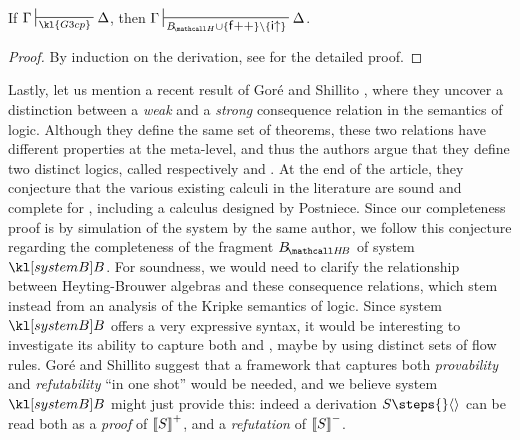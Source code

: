 \begin{lemma}[Simulation of \kl{G3cp}]
  If $\Gamma \prov{\kl{G3cp}} \Delta$, then $\Gamma \prov{\sysBH \cup
  \{\rsf{f{+}{+}}\} \setminus \{\rsf{i{\ua}}\}} \Delta$.
\end{lemma}
\begin{proof}
  By induction on the  derivation, see
   for the detailed proof.
\end{proof}

Lastly, let us mention a recent result of Goré and Shillito
\cite{gore_bi-intuitionistic_2020}, where they uncover a distinction between a
\emph{weak} and a \emph{strong} consequence relation in the semantics of
 logic. Although they define the same set of theorems, these
two relations have different properties at the meta-level, and thus the authors
argue that they define two distinct logics, called respectively  and
. At the end of the article, they conjecture that the various existing
calculi in the literature are sound and complete for , including a
calculus designed by Postniece. Since our completeness proof is by simulation of
the system  by the same author, we follow this conjecture regarding
the completeness of the  fragment $\sysBHB$ of system $\sysB$.
For soundness, we would need to clarify the relationship between Heyting-Brouwer
algebras and these consequence relations, which stem instead from an analysis of
the Kripke semantics of  logic. Since system $\sysB$ offers a
very expressive syntax, it would be interesting to investigate its ability to
capture both  and , maybe by using distinct sets of flow
rules. Goré and Shillito suggest that a framework that captures both
\emph{provability} and \emph{refutability} ``in one shot'' would be needed, and
we believe system $\sysB$ might just provide this: indeed a derivation $S \steps{}
\piq{}$ can be read both as a \emph{proof} of $\left\llbracket S \right\rrbracket^+$, and a
\emph{refutation} of $\left\llbracket S \right\rrbracket^-$.